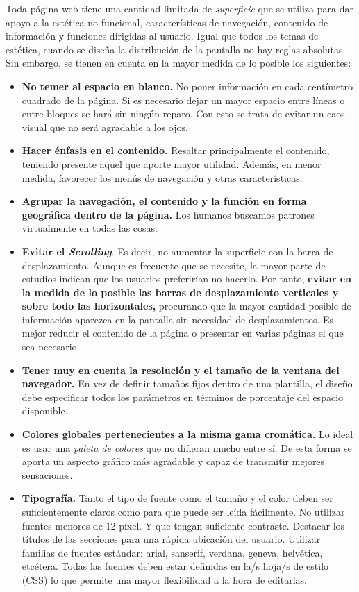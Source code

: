 		Toda página web tiene una cantidad limitada de \textit{superficie} que se utiliza para dar apoyo a la estética no funcional, características de navegación, contenido de información y funciones dirigidas al usuario. Igual que todos los temas de estética, cuando se diseña la distribución de la pantalla no hay reglas absolutas. Sin embargo, se tienen en cuenta en la mayor medida de lo posible los siguientes:
		\begin{itemize}
			\item \textbf{No temer al espacio en blanco.} No poner información en cada centímetro cuadrado de la página. Si es necesario dejar un mayor espacio entre líneas o entre bloques se hará sin ningún reparo. Con esto se trata de evitar un caos visual que no será agradable a los ojos.	
			\item \textbf{Hacer énfasis en el contenido.} Resaltar principalmente el contenido, teniendo presente aquel que aporte mayor utilidad. Además, en menor medida, favorecer los menús de navegación y otras características.
			\item \textbf{Agrupar la navegación, el contenido y la función en forma geográfica dentro de la página.} Los humanos buscamos patrones virtualmente en todas las cosas.
			\item \textbf{Evitar el \textit{Scrolling}}. Es decir, no aumentar la superficie con la barra de desplazamiento. Aunque es frecuente que se necesite, la mayor parte de estudios indican que los usuarios preferirían no hacerlo. Por tanto, \textbf{evitar en la medida de lo posible las barras de desplazamiento verticales y sobre todo las horizontales,} procurando que la mayor cantidad posible de información aparezca en la pantalla sin necesidad de desplazamientos. Es mejor reducir el contenido de la página o presentar en varias páginas el que sea necesario.
			\item \textbf{Tener muy en cuenta la resolución y el tamaño de la ventana del navegador.} En vez de definir tamaños fijos dentro de una plantilla, el diseño debe especificar todos los parámetros en términos de porcentaje del espacio disponible.
			\item \textbf{Colores globales pertenecientes a la misma gama cromática.} Lo ideal es usar una \textit{paleta de colores} que no difieran mucho entre sí. De esta forma se aporta un aspecto gráfico más agradable y capaz de transmitir mejores sensaciones.
			\item \textbf{Tipografía.} Tanto el tipo de fuente como el tamaño y el color deben ser suficientemente claros como para que puede ser leída fácilmente. No utilizar fuentes menores de 12 píxel. Y que tengan suficiente contraste. Destacar los títulos de las secciones para una rápida ubicación del usuario. Utilizar familias de fuentes estándar: arial, sanserif, verdana, geneva, helvética, etcétera. Todas las fuentes deben estar definidas en la/s hoja/s de estilo (CSS) lo que permite una mayor flexibilidad a la hora de editarlas.

\end{itemize}
